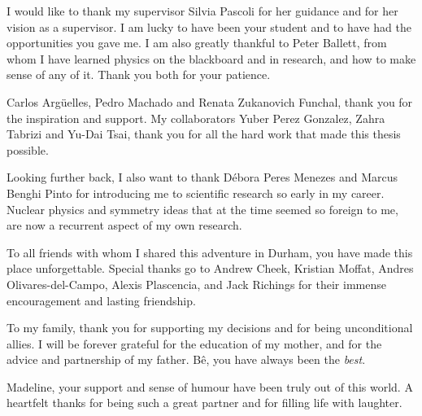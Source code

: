 \documentclass[openany,twoside,frontopenright,chaprunninghead]{ip3thesis}
\begin{document}
\begin{acknowledgements*}

	I would like to thank my supervisor Silvia Pascoli for her guidance and for her vision as a supervisor. I am lucky to have been your student and to have had the opportunities you gave me. I am also greatly thankful to Peter Ballett, from whom I have learned physics on the blackboard and in research, and how to make sense of any of it. Thank you both for your patience.
	
	\vspace{2ex}
	Carlos Arg\"uelles, Pedro Machado and Renata Zukanovich Funchal, thank you for the inspiration and support. My collaborators Yuber Perez Gonzalez, Zahra Tabrizi and Yu-Dai Tsai, thank you for all the hard work that made this thesis possible.
	
	  \vspace{2ex}
	Looking further back, I also want to thank D\'ebora Peres Menezes and Marcus Benghi Pinto for introducing me to scientific research so early in my career. Nuclear physics and symmetry ideas that at the time seemed so foreign to me, are now a recurrent aspect of my own research.
	
	\vspace{2ex}	
	To all friends with whom I shared this adventure in Durham, you have made this place unforgettable. Special thanks go to Andrew Cheek, Kristian Moffat, Andres Olivares-del-Campo, Alexis Plascencia, and Jack Richings for their immense encouragement and lasting friendship.

	\vspace{2ex}
	To my family, thank you for supporting my decisions and for being unconditional allies. I will be forever grateful for the education of my mother, and for the advice and partnership of my father. B\^e, you have always been the \emph{best}.
	
	\vspace{2ex}
	Madeline, your support and sense of humour have been truly out of this world. A heartfelt thanks for being such a great partner and for filling life with laughter.
	
\end{acknowledgements*}



\cleardoublepage
\end{document}
